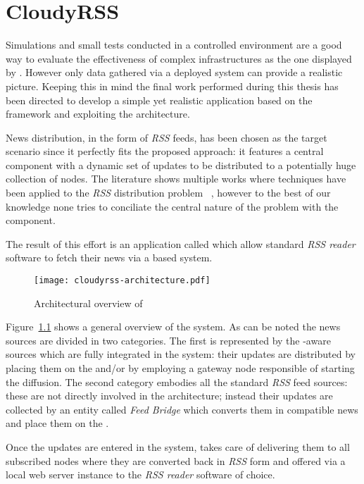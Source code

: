 \chapter{CloudyRSS}
Simulations and small tests conducted in a controlled environment are a
good way to evaluate the effectiveness of complex infrastructures as the
one displayed by \cloudcast. However only data gathered via a
deployed system can provide a realistic picture.
Keeping this in mind the final work performed during this thesis
has been directed to develop a simple yet realistic application based
on the \cloudypeer framework and exploiting the \cloudcast
architecture.

News distribution, in the form of \textit{RSS} feeds, has been chosen as
the target scenario since it perfectly fits the proposed
approach: it features a central component with a dynamic set of
updates to be distributed to a potentially huge collection of nodes.
The literature shows multiple works where \ptop techniques
have been applied to the \textit{RSS} distribution
problem~\cite{P2PFeedDelivery}
\cite{AttackResilientP2PFeedDissemination}
\cite{SimpleSecurityP2PFeedDissemination}, however to the best of our
knowledge none tries to conciliate the central nature of the problem
with the \ptop component.

The result of this effort is an application called \cloudyrss which
allow standard \textit{RSS reader} software to fetch their news via a
\cloudcast based system.

\begin{figure}[h!]
  \texttt{[image: cloudyrss-architecture.pdf]}
  \caption{Architectural overview of \cloudyrss}
  \label{fig:cloudyrss-architecture}
\end{figure}

Figure~\ref{fig:cloudyrss-architecture} shows a general overview of
the system. As can be noted the news sources are divided in two
categories. The first is represented by the \cloudyrss-aware sources
which are fully integrated in the system: their updates are distributed
by placing them on the \cloud and/or by employing a gateway node
responsible of starting the \epidemic diffusion.
The second category embodies all the standard \textit{RSS} feed
sources: these are not directly involved in the architecture; instead their
updates are collected by an entity called \textit{Feed
  Bridge} which converts them in \cloudyrss compatible news and place
them on the \cloud.

Once the updates are entered in the system, \cloudcast takes care of
delivering them to all subscribed nodes where they are converted back in
\textit{RSS} form and offered via a local web server instance to the
\textit{RSS reader} software of choice.

